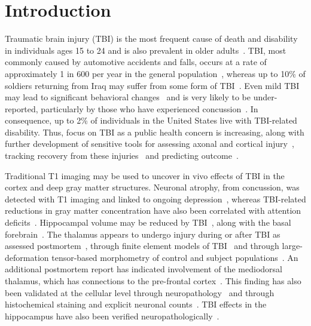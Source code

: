 \section{Introduction}
Traumatic brain injury (TBI) is the most frequent cause of death and disability in individuals ages 15 to 24 and is also prevalent in older adults~\cite{Furlow2006}. TBI, most commonly caused by automotive accidents and falls, occurs at a rate of approximately 1 in 600 per year in the general population~\cite{Furlow2006}, whereas up to 10\% of soldiers returning from Iraq may suffer from some form of TBI~\cite{Hoge2008}. Even mild TBI may lead to significant behavioral changes~\cite{Kraus2007} and is very likely to be under-reported, particularly by those who have experienced concussion~\cite{Mendez2005,Chen2008}. In consequence, up to 2\% of individuals in the United States live with TBI-related disability. Thus, focus on TBI as a public health concern is increasing, along with further development of sensitive tools for assessing axonal and cortical injury~\cite{Kraus2007,Kim2008}, tracking recovery from these injuries~\cite{Levin2003} and predicting outcome~\cite{Miles2008,Sidaros2008}.

Traditional T1 imaging may be used to uncover in vivo effects of TBI in the cortex and deep gray matter structures. Neuronal atrophy, from concussion, was detected with T1 imaging and linked to ongoing depression~\cite{Chen2008}, whereas TBI-related reductions in gray matter concentration have also been correlated with attention deficits~\cite{Gale2005}. Hippocampal volume may be reduced by TBI~\cite{Tomaiuolo2004,Salmond2005}, along with the basal forebrain~\cite{Salmond2005}. The thalamus appears to undergo injury during or after TBI as assessed postmortem~\cite{Graham2005}, through finite element models of TBI~\cite{Mendez2005,Zhang2004} and through large-deformation tensor-based morphometry of control and subject populations~\cite{Kim2008}. An additional postmortem report has indicated involvement of the mediodorsal thalamus, which has connections to the pre-frontal cortex~\cite{Maxwell2004}. This finding has also been validated at the cellular level through neuropathology~\cite{Adams2000} and through histochemical staining and explicit neuronal counts~\cite{Maxwell2006}. TBI effects in the hippocampus have also been verified neuropathologically~\cite{Ahn2006}.

